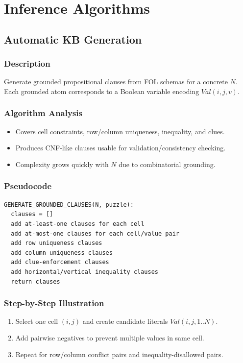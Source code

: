 \documentclass[12pt,a4paper]{article}
\begin{document}
\section{Inference Algorithms}

\subsection{Automatic KB Generation}
\subsubsection{Description}
Generate grounded propositional clauses from FOL schemas for a concrete $N$.
Each grounded atom corresponds to a Boolean variable encoding $Val(i,j,v)$.

\subsubsection{Algorithm Analysis}
\begin{itemize}
    \item Covers cell constraints, row/column uniqueness, inequality, and clues.
    \item Produces CNF-like clauses usable for validation/consistency checking.
    \item Complexity grows quickly with $N$ due to combinatorial grounding.
\end{itemize}

\subsubsection{Pseudocode}
\begin{lstlisting}[style=pseudostyle, caption={Ground KB Generation}]
GENERATE_GROUNDED_CLAUSES(N, puzzle):
  clauses = []
  add at-least-one clauses for each cell
  add at-most-one clauses for each cell/value pair
  add row uniqueness clauses
  add column uniqueness clauses
  add clue-enforcement clauses
  add horizontal/vertical inequality clauses
  return clauses
\end{lstlisting}

\subsubsection{Step-by-Step Illustration}
\begin{enumerate}
    \item Select one cell $(i,j)$ and create candidate literals $Val(i,j,1..N)$.
    \item Add pairwise negatives to prevent multiple values in same cell.
    \item Repeat for row/column conflict pairs and inequality-disallowed pairs.
\end{enumerate}
\end{document}
